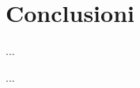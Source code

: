 \documentclass[a4paper,12pt]{report}
\begin{document}
% 
% 
\chapter{Conclusioni}
\label{conclusion}

%
%
\begin{thebibliography}{00}



%
...
%
%
\end{thebibliography}
% 

%
%
...
\end{document}
